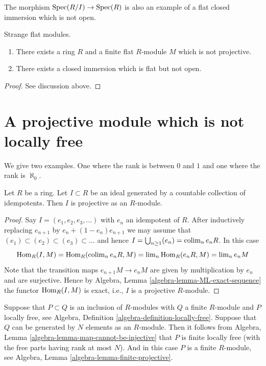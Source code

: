 \medskip\noindent
The morphism $\mathop{\mathrm{Spec}}(R/I) \to \mathop{\mathrm{Spec}}(R)$ is also
an example of a flat closed immersion which is not open.

\begin{lemma}
\label{lemma-finite-flat-non-projective}
Strange flat modules.
\begin{enumerate}
\item There exists a ring $R$ and a finite flat $R$-module $M$ which is
not projective.
\item There exists a closed immersion which is flat but not open.
\end{enumerate}
\end{lemma}

\begin{proof}
See discussion above.
\end{proof}



\section{A projective module which is not locally free}
\label{section-projective-not-locally-free}

\noindent
We give two examples. One where the rank is between $0$ and $1$
and one where the rank is $\aleph_0$.

\begin{lemma}
\label{lemma-ideal-generated-by-idempotents-projective}
Let $R$ be a ring. Let $I \subset R$ be an ideal generated by
a countable collection of idempotents. Then $I$ is projective
as an $R$-module.
\end{lemma}

\begin{proof}
Say $I = (e_1, e_2, e_3, \ldots)$ with $e_n$ an idempotent of $R$.
After inductively replacing $e_{n + 1}$ by $e_n + (1 - e_n)e_{n + 1}$
we may assume that $(e_1) \subset (e_2) \subset (e_3) \subset \ldots$
and hence $I = \bigcup_{n \geq 1} (e_n) = \mathop{\mathrm{colim}}\nolimits_n e_nR$.
In this case
$$
\mathop{\mathrm{Hom}}\nolimits_R(I, M) = \mathop{\mathrm{Hom}}\nolimits_R(\mathop{\mathrm{colim}}\nolimits_n e_nR, M)
= \mathop{\mathrm{lim}}\nolimits_n \mathop{\mathrm{Hom}}\nolimits_R(e_nR, M) = \mathop{\mathrm{lim}}\nolimits_n e_nM
$$
Note that the transition maps $e_{n + 1}M \to e_nM$ are given
by multiplication by $e_n$ and are surjective. Hence by
Algebra, Lemma \ref{algebra-lemma-ML-exact-sequence}
the functor $\mathop{\mathrm{Hom}}\nolimits_R(I, M)$ is exact, i.e., $I$ is a projective
$R$-module.
\end{proof}

\noindent
Suppose that $P \subset Q$ is an inclusion of $R$-modules with $Q$ a
finite $R$-module and $P$ locally free, see
Algebra, Definition \ref{algebra-definition-locally-free}.
Suppose that $Q$ can be generated by $N$ elements as an $R$-module.
Then it follows from
Algebra, Lemma \ref{algebra-lemma-map-cannot-be-injective}
that $P$ is finite locally free (with the free parts having rank
at most $N$). And in this case $P$ is a finite $R$-module, see
Algebra, Lemma \ref{algebra-lemma-finite-projective}.

